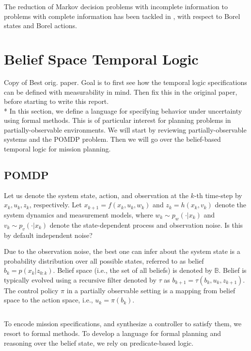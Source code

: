 \documentclass[conference]{IEEEtran}
\newcommand{\red}[1]{{\color{red} #1}}
\begin{document}
 
 
 
The reduction of Markov decision problems with incomplete information to problems with complete information has been tackled in
\cite{yushkevich_reduction_1976,rhenius_incomplete_1974}, with respect to Borel states and Borel actions.





\section{Belief Space Temporal Logic}
	\red{Copy of Best orig. paper. Goal is to first see how the temporal logic specifications can be defined with measurability in mind. Then fix this in the original paper, before starting to write this report.\\*}
	In this section, we define a language for specifying behavior under uncertainty using formal methods. This is of particular interest for planning problems in partially-observable environments.
	 We will start by reviewing partially-observable systems and the POMDP problem. Then we will go over the belief-based temporal logic for mission planning.
	
	\subsection{POMDP}\label{sec:POMDP}
	Let us denote the system state, action, and observation at the $k$-th time-step by $x_k, u_k, z_k$, respectively. Let $x_{k+1}=f(x_k,u_k,w_k)$ and $z_k=h(x_k,v_k)$ denote the system dynamics and measurement models, where $w_k\sim p_w(\cdot|x_k)$ and $v_k\sim p_v(\cdot|x_k)$ denote the state-dependent process and observation noise.  \red{Is this by default independent noise?}
	
	
	Due to the observation noise, the best one can infer about the system state is a probability distribution over all possible states, referred to as belief $b_k=p(x_k|z_{0:k})$. Belief space (i.e., the set of all beliefs) is denoted by $\mathbb{B}$. Belief is typically evolved using a recursive filter denoted by $\tau$ as $b_{k+1}=\tau(b_k,u_k,z_{k+1})$. The control policy $\pi$ in a partially observable setting is a mapping from belief space to the action space, i.e., $u_k=\pi(b_k)$. 
    
    
	\subsection{\DTL}\label{sec:DTL}
    To encode mission specifications, and synthesize a controller to satisfy them, we resort to formal methods. To develop a language for formal planning and reasoning over the belief state, we rely on predicate-based logic.
    
\end{document}
